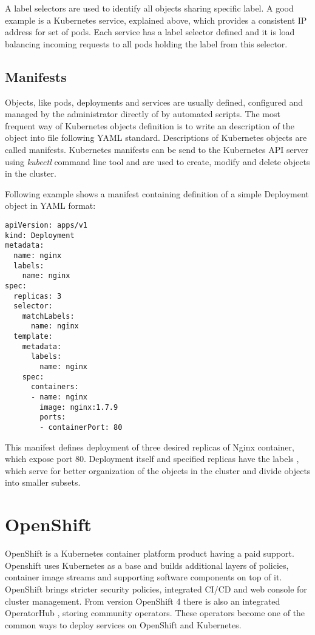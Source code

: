 \documentclass[
  digital, %
  twoside, %
  table,   %
  lof,     %
  lot,     %
]{fithesis3}
\begin{document}
A label selectors are used to identify all objects sharing specific label. A good example is a Kubernetes service, explained above, which provides a consistent IP address for set of pods. Each service has a label selector defined and it is load balancing incoming requests to all pods holding the label from this selector.

\subsection{Manifests} \label{sec:manifest}
Objects, like pods, deployments and services are usually defined, configured and managed by the administrator directly of by automated scripts. The most frequent way of Kubernetes objects definition is to write an description of the object into file following YAML \cite{YAML} standard. Descriptions of Kubernetes objects are called manifests. Kubernetes manifests can be send to the Kubernetes API server \cite{kubernetes-api} using \textit{kubectl} \cite{kubectl} command line tool and are used to create, modify and delete objects in the cluster.

Following example shows a manifest containing definition of a simple Deployment object in YAML format:
\begin{lstlisting}
apiVersion: apps/v1
kind: Deployment
metadata:
  name: nginx
  labels:
    name: nginx
spec:
  replicas: 3
  selector:
    matchLabels:
      name: nginx
  template:
    metadata:
      labels:
        name: nginx
    spec:
      containers:
      - name: nginx
        image: nginx:1.7.9
        ports:
        - containerPort: 80
\end{lstlisting}

This manifest defines deployment of three desired replicas of Nginx \cite{nginx} container, which expose port 80. Deployment itself and specified replicas have the labels \cite{labels_selectors}, which serve for better organization of the objects in the cluster and divide objects into smaller subsets.

\section{OpenShift} \label{sec:openshift}
OpenShift \cite{rhccos} is a Kubernetes container platform product having a paid support. Openshift uses Kubernetes as a base and builds additional layers of policies, container image streams and supporting software components on top of it. OpenShift brings stricter security policies, integrated CI/CD and web console for cluster management. From version OpenShift 4 there is also an integrated OperatorHub \cite{operatorhub}, storing community operators. These operators become one of the common ways to deploy services on OpenShift and Kubernetes.
\end{document}
